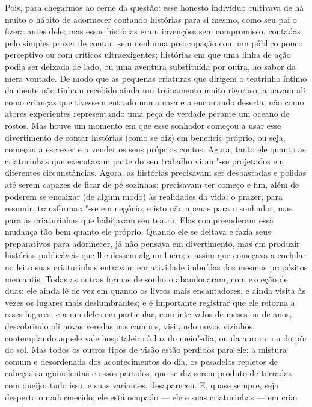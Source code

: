 Pois, para chegarmos ao cerne da questão: esse honesto indivíduo
cultivava de há muito o hábito de adormecer contando histórias para si
mesmo, como seu pai o fizera antes dele; mas essas histórias eram
invenções sem compromisso, contadas pelo simples prazer de contar, sem
nenhuma preocupação com um público pouco perceptivo ou com críticos
ultraexigentes; histórias em que uma linha de ação podia ser deixada
de lado, ou uma aventura substituída por outra, ao sabor da mera
vontade.  De modo que as pequenas criaturas que dirigem o teatrinho
íntimo da mente não tinham recebido ainda um treinamento muito
rigoroso; atuavam ali como crianças que tivessem entrado numa casa e a
encontrado deserta, não como atores experientes representando uma peça
de verdade perante um oceano de rostos.  Mas houve um momento em que
esse sonhador começou a usar esse divertimento de contar histórias
(como se diz) em benefício próprio, ou seja, começou a escrever e a
vender os seus próprios contos.  Agora, tanto ele quanto as
criaturinhas que executavam parte do seu trabalho viram"-se projetados
em diferentes circunstâncias.  Agora, as histórias precisavam ser
desbastadas e polidas até serem capazes de ficar de pé sozinhas;
precisavam ter começo e fim, além de poderem se encaixar (de algum
modo) às realidades da vida; o prazer, para resumir, transformara"-se em
negócio; e isto não apenas para o sonhador, mas para as criaturinhas
que habitavam seu teatro.  Elas compreenderam essa mudança tão bem
quanto ele próprio.  Quando ele se deitava e fazia seus preparativos
para adormecer, já não pensava em divertimento, mas em produzir
histórias publicáveis que lhe dessem algum lucro; e assim que começava
a cochilar no leito suas criaturinhas entravam em atividade imbuídas
dos mesmos propósitos mercantis.  Todas as outras formas de sonho o
abandonaram, com exceção de duas: ele ainda lê de vez em quando os
livros mais encantadores, e ainda visita às vezes os lugares mais
deslumbrantes; e é importante registrar que ele retorna a esses
lugares, e a um deles em particular, com intervalos de meses ou de
anos, descobrindo ali novas veredas nos campos, visitando novos
vizinhos, contemplando aquele vale hospitaleiro à luz do meio"-dia, ou
da aurora, ou do pôr do sol.  Mas todos os outros tipos de visão estão
perdidos para ele: a mistura comum e desordenada dos acontecimentos do
dia, os pesadelos repletos de cabeças sanguinolentas e ossos partidos,
que se diz serem produto de torradas com queijo; tudo isso, e suas
variantes, desapareceu.  E, quase sempre, seja desperto ou adormecido,
ele está ocupado --- ele e suas criaturinhas --- em criar
